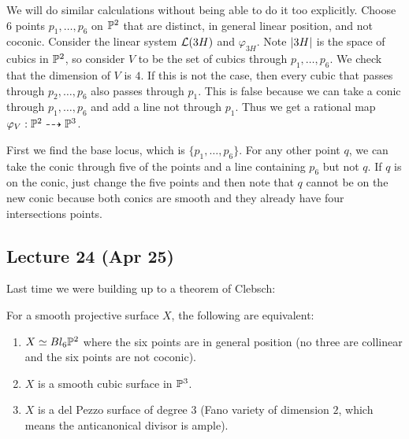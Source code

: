 \documentclass[twoside, 10pt]{article}
\begin{document}
        \begin{exm} We will do similar calculations without being able to do it
            too explicitly. Choose $6$ points $p_1, \ldots, p_6$ on $\P^2$ that
            are distinct, in general linear position, and not coconic. Consider
            the linear system $\mc{L}(3H)$ and $\varphi_{3H}$. Note $\abs{3H}$
            is the space of cubics in $\P^2$, so consider $V$ to be the set of
            cubics through $p_1, \ldots, p_6$. We check that the dimension of
            $V$ is $4$. If this is not the case, then every cubic that passes
            through $p_2, \ldots, p_6$ also passes through $p_1$. This is false
            because we can take a conic through $p_1, \ldots, p_6$ and add a
            line not through $p_1$. Thus we get a rational map $\varphi_V: \P^2
            \dashrightarrow \P^3$.

            First we find the base locus, which is $\{p_1, \ldots, p_6\}$. For
            any other point $q$, we can take the conic through five of the
            points and a line containing $p_6$ but not $q$. If $q$ is on the
            conic, just change the five points and then note that $q$ cannot be
        on the new conic because both conics are smooth and they already have
    four intersections points.  \end{exm}

        \subsection{Lecture 24 (Apr 25)} Last time we were building up to a
        theorem of Clebsch: \begin{thm}[Clebsch] For a smooth projective
            surface $X$, the following are equivalent: \begin{enumerate} \item
                $X \simeq Bl_6\P^2$ where the six points are in general
                position (no three are collinear and the six points are not
                coconic).  \item $X$ is a smooth cubic surface in $\P^3$.
            \item $X$ is a del Pezzo surface of degree $3$ (Fano variety of
        dimension $2$, which means the anticanonical divisor is ample).
\end{enumerate} \end{thm}
\end{document}
